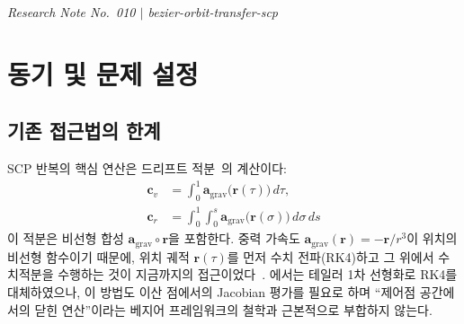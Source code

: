 \documentclass[11pt]{article}
\begin{document}
\drawborder
\thispagestyle{firstpage}


{\normalsize\textit{Research Note No.~010 $|$ bezier-orbit-transfer-scp}}\par\medskip

\def\lighterdate{March 16, 2026}


\begin{abstract}
\cite{report009}의 아핀 드리프트 근사는 중력장 $\mathbf{a}_\mathrm{grav}(\mathbf{r})$를
테일러 1차 전개로 선형화하여 수치적분을 제거하였으나,
근사 정확도가 세분화 수 $K$와 참조 궤도 품질에 제한된다.
본 노트에서는 Bernstein 다항식의 대수적 성질---곱(product),
합성(composition), 차수 축소(degree reduction)---을 체계적으로 활용하여,
비선형 중력 가속도 $\mathbf{a}_\mathrm{grav}(\mathbf{r}(\tau))$를
\textbf{제어점 벡터 공간 내에서 완전히 닫힌 형태로} 계산하는 프레임워크를 유도한다.
결과적으로 드리프트 적분 $\mathbf{c}_v$, $\mathbf{c}_r$이
적분 행렬의 행렬 곱으로 \textbf{정확하게} 계산되며,
유일한 근사원은 $r^{-3}$의 다항식 근사 차수 $K$뿐이다.
\end{abstract}

\section{동기 및 문제 설정}
\label{sec:motivation}

\subsection{기존 접근법의 한계}

SCP 반복의 핵심 연산은 드리프트 적분~\cite{report006}의 계산이다:
\begin{align}
  \mathbf{c}_v &= \int_0^1 \mathbf{a}_\mathrm{grav}\bigl(\mathbf{r}(\tau)\bigr)\,d\tau,
  \label{eq:cv-def} \\
  \mathbf{c}_r &= \int_0^1 \!\int_0^s \mathbf{a}_\mathrm{grav}\bigl(\mathbf{r}(\sigma)\bigr)\,d\sigma\,ds
  \label{eq:cr-def}
\end{align}
이 적분은 비선형 합성 $\mathbf{a}_\mathrm{grav} \circ \mathbf{r}$을 포함한다.
중력 가속도 $\mathbf{a}_\mathrm{grav}(\mathbf{r}) = -\mathbf{r}/r^3$이
위치의 비선형 함수이기 때문에,
위치 궤적 $\mathbf{r}(\tau)$를 먼저 수치 전파(RK4)하고
그 위에서 수치적분을 수행하는 것이 지금까지의 접근이었다~\cite{report008}.
\cite{report009}에서는 테일러 1차 선형화로 RK4를 대체하였으나,
이 방법도 이산 점에서의 Jacobian 평가를 필요로 하며
``제어점 공간에서의 닫힌 연산''이라는 베지어 프레임워크의 철학과 근본적으로 부합하지 않는다.
\end{document}
